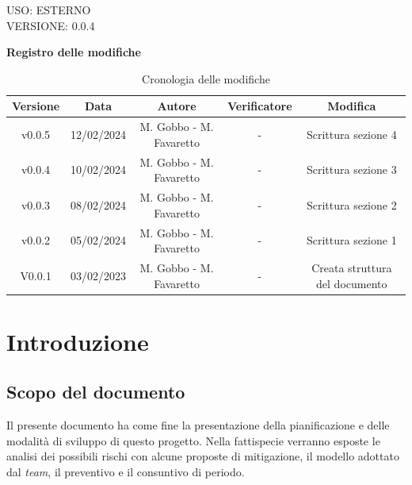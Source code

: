 \documentclass[5pt]{article}
\begin{document}
\begin{flushright}
    \begin{spacing}{1}
        USO: ESTERNO\\
        VERSIONE: 0.0.4\\
    \end{spacing}
\end{flushright}


\restoregeometry

\pagebreak

\textbf{\Large Registro delle modifiche}
\begin{table}[ht]
\centering
\begin{tabular}{|c|c|c|c|c|}
\hline
\textbf{Versione} & \textbf{Data} & \textbf{Autore} & \textbf{Verificatore} & \textbf{Modifica} \\
\hline
v0.0.5 & 12/02/2024 & M. Gobbo - M. Favaretto & - & Scrittura sezione 4 \\
\hline
v0.0.4 & 10/02/2024 & M. Gobbo - M. Favaretto & - & Scrittura sezione 3 \\
\hline
v0.0.3 & 08/02/2024 & M. Gobbo - M. Favaretto & - & Scrittura sezione 2 \\
\hline
v0.0.2 & 05/02/2024 & M. Gobbo - M. Favaretto & - & Scrittura sezione 1 \\
\hline
V0.0.1 & 03/02/2023 & M. Gobbo - M. Favaretto & - & Creata struttura del documento \\
\hline
\end{tabular}
\caption{Cronologia delle modifiche}
\label{tab:conference}
\end{table}

\pagebreak
\tableofcontents
\pagebreak

\section{Introduzione}
\subsection{Scopo del documento}
Il presente documento ha come fine la presentazione della pianificazione e delle modalità di sviluppo di questo progetto. 
Nella fattispecie verranno esposte le analisi dei possibili rischi con alcune proposte di mitigazione, il modello adottato dal \textit{team}, 
il preventivo e il consuntivo di periodo.
\end{document}
